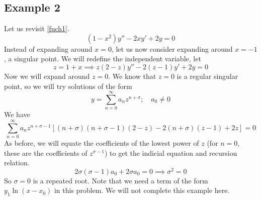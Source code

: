 \subsection{Example 2}
Let us revisit \eqref{fuch1}.
\[ (1-x^2)y'' - 2xy' + 2y = 0 \]
Instead of expanding around $x=0$, let us now consider expanding around $x=-1$, a singular point. We will redefine the independent variable, let
\[ z = 1 + x \implies z(2-z)y'' - 2(z-1)y' + 2y = 0 \]
Now we will expand around $z=0$. We know that $z=0$ is a regular singular point, so we will try solutions of the form
\[ y = \sum_{n=0}^\infty a_nz^{n+\sigma};\quad a_0 \neq 0 \]
We have
\[ \sum_{n=0}^\infty a_nz^{n+\sigma-1}\left[ (n+\sigma)(n+\sigma-1)(2-z) - 2(n+\sigma)(z-1) + 2z \right] = 0 \]
As before, we will equate the coefficients of the lowest power of $z$ (for $n=0$, these are the coefficients of $z^{\sigma - 1}$) to get the indicial equation and recursion relation.
\[ 2\sigma(\sigma - 1)a_0 + 2\sigma a_0 = 0 \implies \sigma^2 = 0 \]
So $\sigma = 0$ is a repeated root. Note that we need a term of the form $y_1\ln (x-x_0)$ in this problem. We will not complete this example here.
